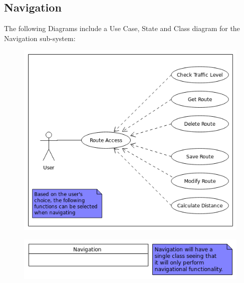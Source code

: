 \documentclass{article}
\begin{document}
	\subsection{Navigation}
	The following Diagrams include a Use Case, State and Class diagram for the Navigation sub-system:
	\FloatBarrier	
	\begin{figure}[h]
  		\includegraphics[width=\textwidth]{Images/NavigationUseCase.png}
	\end{figure}
	\begin{figure}[h]
  		\includegraphics[width=\textwidth]{Images/NavigationClass.png}
	\end{figure}
\end{document}
